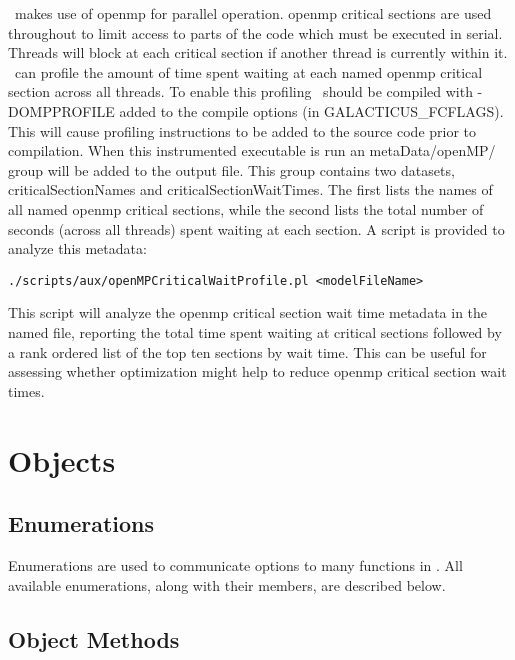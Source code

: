 \glc\ makes use of \gls{openmp} for parallel operation. \gls{openmp} {\normalfont \ttfamily critical} sections are used throughout to limit access to parts of the code which must be executed in serial. Threads will block at each {\normalfont \ttfamily critical} section if another thread is currently within it. \glc\ can profile the amount of time spent waiting at each named \gls{openmp} {\normalfont \ttfamily critical} section across all threads. To enable this profiling \glc\ should be compiled with {\normalfont \ttfamily -DOMPPROFILE} added to the compile options (in {\normalfont \ttfamily GALACTICUS\_FCFLAGS}). This will cause profiling instructions to be added to the source code prior to compilation. When this instrumented executable is run an {\normalfont \ttfamily metaData/openMP/} group will be added to the output file. This group contains two datasets, {\normalfont \ttfamily criticalSectionNames} and {\normalfont \ttfamily criticalSectionWaitTimes}. The first lists the names of all named \gls{openmp} {\normalfont \ttfamily critical} sections, while the second lists the total number of seconds (across all threads) spent waiting at each section. A script is provided to analyze this metadata:
\begin{verbatim}
./scripts/aux/openMPCriticalWaitProfile.pl <modelFileName>
\end{verbatim}
This script will analyze the \gls{openmp} {\normalfont \ttfamily critical} section wait time metadata in the named file, reporting the total time spent waiting at critical sections followed by a rank ordered list of the top ten sections by wait time. This can be useful for assessing whether optimization might help to reduce \gls{openmp} {\normalfont \ttfamily critical} section wait times.

\section{Objects}

\subsection{Enumerations}

Enumerations are used to communicate options to many functions in \glc. All available enumerations, along with their members, are described below.





\subsection{Object Methods}

